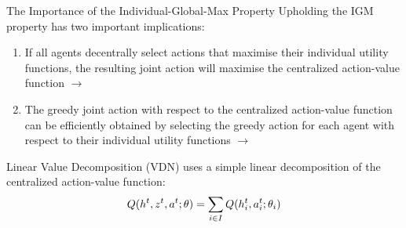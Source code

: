 \begin{frame}[t]{The Importance of the Individual-Global-Max Property}
    Upholding the IGM property has two important implications:
    \begin{enumerate}
        \item<2-> If all agents decentrally select actions that maximise their individual utility functions, the resulting joint action will maximise the centralized action-value function $\rightarrow$ 
        \item<3-> The greedy joint action with respect to the centralized action-value function can be efficiently obtained by selecting the greedy action for each agent with respect to their individual utility functions $\rightarrow$ 
    \end{enumerate}

\end{frame}

\begin{frame}[t]{Linear Value Decomposition}
     (VDN) uses a simple linear decomposition of the centralized action-value function:
    \begin{equation*}
        Q(h^t, z^t, a^t; \theta) = \sum_{i\in I} Q(h^t_i, a^t_i; \theta_i)
    \end{equation*}

\end{frame}

